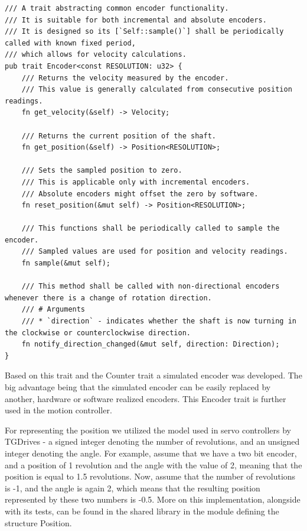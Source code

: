 \begin{lstlisting}[caption={Encoder trait for abstracting encoders.},label=lst:encoder_trait]
/// A trait abstracting common encoder functionality.
/// It is suitable for both incremental and absolute encoders.
/// It is designed so its [`Self::sample()`] shall be periodically called with known fixed period,
/// which allows for velocity calculations.
pub trait Encoder<const RESOLUTION: u32> {
    /// Returns the velocity measured by the encoder.
    /// This value is generally calculated from consecutive position readings.
    fn get_velocity(&self) -> Velocity;

    /// Returns the current position of the shaft.
    fn get_position(&self) -> Position<RESOLUTION>;

    /// Sets the sampled position to zero.
    /// This is applicable only with incremental encoders.
    /// Absolute encoders might offset the zero by software.
    fn reset_position(&mut self) -> Position<RESOLUTION>;

    /// This functions shall be periodically called to sample the encoder.
    /// Sampled values are used for position and velocity readings.
    fn sample(&mut self);

    /// This method shall be called with non-directional encoders whenever there is a change of rotation direction.
    /// # Arguments
    /// * `direction` - indicates whether the shaft is now turning in the clockwise or counterclockwise direction.
    fn notify_direction_changed(&mut self, direction: Direction);
}
\end{lstlisting}

Based on this trait and the Counter trait a simulated encoder was developed.
The big advantage being that the simulated encoder can be easily replaced by another, hardware or software realized encoders.
This Encoder trait is further used in the motion controller.

For representing the position we utilized the model used in servo controllers by TGDrives - a signed integer denoting the number of revolutions, and an unsigned integer denoting the angle.
For example, assume that we have a two bit encoder, and a position of 1 revolution and the angle with the value of 2, meaning that the position is equal to 1.5 revolutions.
Now, assume that the number of revolutions is -1, and the angle is again 2, which means that the resulting position represented by these two numbers is -0.5.
More on this implementation, alongside with its tests, can be found in the shared library in the module defining the structure Position.

